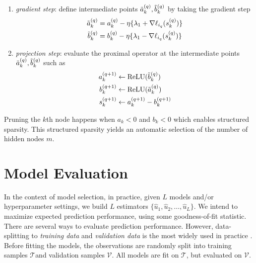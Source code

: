 \documentclass{article}
\newcommand{\mouloud}{\textcolor{dark_green}}
\newtheorem{remark}{Remark}
\begin{document}
\begin{enumerate}
    \item \emph{gradient step}: define intermediate points $\Tilde{a}_k^{(q)}, \Tilde{b}_k^{(q)}$ by taking the gradient step 
    \begin{align*}
        \Tilde{a}_k^{(q)} &= a_k^{(q)} - \eta \{ \lambda_1 + \nabla \ell_{i_q}(s_k^{(q)})\}\\
        \Tilde{b}_k^{(q)} &= b_k^{(q)} - \eta \{ \lambda_1 - \nabla \ell_{i_q}(s_k^{(q)})\}
    \end{align*}
%
%    
    \item \emph{projection step}: evaluate the proximal operator at the intermediate points $\Tilde{a}_k^{(q)}, \Tilde{b}_k^{(q)}$ such as
%   
    \begin{align*}
        a_k^{(q+1)} &\leftarrow \mathrm{ReLU}(\Tilde{b}_k^{(q)})\\
        b_k^{(q+1)} &\leftarrow \mathrm{ReLU}(\Tilde{a}_k^{(q)})\\
        s_k^{(q+1)} &\leftarrow a_k^{(q+1)} - b_k^{(q+1)} 
    \end{align*}
\end{enumerate}
Pruning the $k$th node happens when $a_k<0$ and $b_k<0$ which enables structured sparsity. This  structured sparsity yields an automatic selection of the number of hidden nodes $m$.


\section{Model Evaluation}\label{sec:qini}

In the context of model selection, in practice, given $L$ models and/or hyperparameter settings, we build $L$ estimators $\{ \hat{u}_1, \hat{u}_2, \ldots, \hat{u}_L \}$. We intend to maximize expected prediction performance, using some goodness-of-fit statistic.  There are several ways to evaluate prediction performance. However, data-splitting to \emph{training data} and \emph{validation data} is the most widely used in practice \citep{arlot2010survey}. Before fitting the models, the observations are randomly split into training samples $\mathcal T$and validation samples $\mathcal V$. All models are fit on  $\mathcal{T}$, but evaluated on $\mathcal{V}$. 
\end{document}
